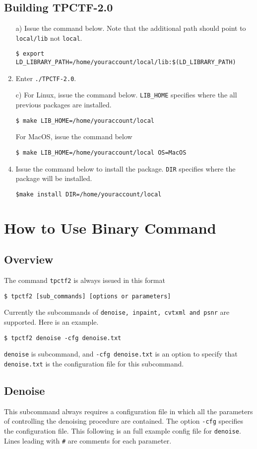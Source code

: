 \documentclass[a4paper,5pt]{article}
\begin{document}
\subsection{Building TPCTF-2.0}
\begin{enumerate}
\item[a)] Issue the command below. Note that the additional path should point to \lstinline{local/lib} not \lstinline{local}.

\lstinline{$ export LD_LIBRARY_PATH=/home/youraccount/local/lib:$(LD_LIBRARY_PATH)}
\item[b)] Enter \lstinline{./TPCTF-2.0}.
\item[c)] For Linux, issue the command below. \lstinline{LIB_HOME} specifies where the all previous packages are installed.

\lstinline{$ make LIB_HOME=/home/youraccount/local}

For MacOS, issue the command below

\lstinline{$ make LIB_HOME=/home/youraccount/local OS=MacOS}
\item[d)] Issue the command below to install the package. \lstinline{DIR} specifies where the package will be installed.

\lstinline{$make install DIR=/home/youraccount/local}

\end{enumerate}


\section{How to Use Binary Command}

\subsection{Overview}

The command \lstinline{tpctf2} is always issued in this format

\lstinline{$ tpctf2 [sub_commands] [options or parameters]}

Currently the subcommands of \lstinline{denoise, inpaint, cvtxml and psnr} are supported. Here is an example.

\lstinline{$ tpctf2 denoise -cfg denoise.txt}

\lstinline{denoise} is subcommand, and \lstinline{-cfg denoise.txt} is an option to specify that \lstinline{denoise.txt} is the configuration file for this subcommand.

\subsection{Denoise}
This subcommand always requires a configuration file in which all the parameters of controlling the denoising procedure are contained. The option \lstinline{-cfg} specifies the configuration file. This following is an full example config file for \lstinline{denoise}. Lines leading with \lstinline{#} are comments for each parameter.
\end{document}
